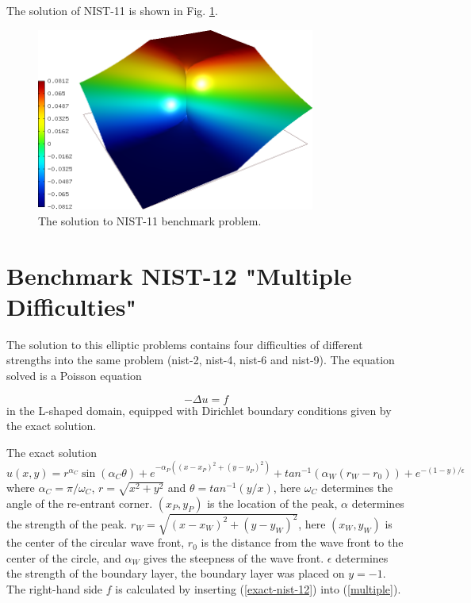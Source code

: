 \documentclass[12pt]{elsarticle}
\begin{document}
The solution of NIST-11 is shown in Fig. \ref{fig:sln-nist11}.

\begin{figure}[!ht]
\centering
\includegraphics[height=6cm]{nist/nist-11/solution.png}
\caption{The solution to NIST-11 benchmark problem.}
\label{fig:sln-nist11}
\end{figure}


\section{Benchmark NIST-12 "Multiple Difficulties"}
\label{sec:bench-12}

The solution to this elliptic problems contains four difficulties
of different strengths into the same problem
(nist-2, nist-4, nist-6 and nist-9).
The equation solved is a Poisson equation

\begin{equation} \label{multiple}
-\Delta u = f
\end{equation}
in the L-shaped domain, equipped with Dirichlet boundary conditions
given by the exact solution.

The exact solution
\begin{equation}\label{exact-nist-12}
u(x,y) =  r^{\alpha_{C} }\sin(\alpha_{C} \theta)
+ e^{-\alpha_{P} ((x - x_{P})^{2} + (y - y_{P})^{2})}
+ tan^{-1}(\alpha_{W} (r_{W} - r_{0}))
+ e^{-(1 - y) / \epsilon}
\end{equation}
where $\alpha_C = \pi / \omega_C$, $r = \sqrt{x^2+y^2}$
and $\theta = tan^{-1}(y/x)$, here $\omega_C$ determines
the angle of the re-entrant corner.
$(x_{P}, y_{P})$ is the location of the peak, $\alpha$
determines the strength of the peak.
$r_{W} = \sqrt{(x - x_{W})^{2} + (y - y_{W})^{2}}$,
here $(x_{W}, y_{W})$ is the center of the circular wave front,
$r_{0}$ is the distance from the wave front to the
center of the circle, and $\alpha_W$ gives
the steepness of the wave front. $\epsilon$ determines the
strength of the boundary layer, the boundary layer was placed on $y = -1$.
The right-hand side $f$ is calculated by inserting (\ref{exact-nist-12})
into (\ref{multiple}). \\
\end{document}
